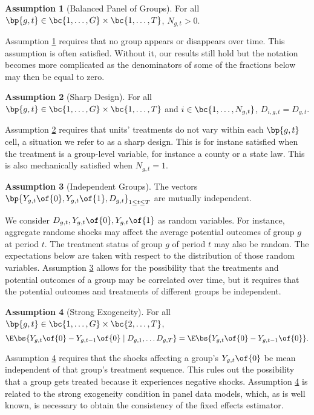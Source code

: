 \documentclass[12pt]{article}
\theoremstyle{definition}
\newtheorem{assumption}{Assumption}
\begin{document}
\begin{assumption}[Balanced Panel of Groups] \label{BPG}
    For all $\bp{g, t} \in \bc{1, \ldots, G} \times \bc{1, \ldots, T}$, $N_{g,t} > 0$.
\end{assumption}

Assumption \ref{BPG} requires that no group appears or disappears over time. This assumption is often satisfied. Without it, our results still hold but the notation becomes more complicated as the denominators of some of the fractions below may then be equal to zero. 

\begin{assumption}[Sharp Design] \label{SD}
    For all $\bp{g, t} \in \bc{1, \ldots, G} \times \bc{1, \ldots, T}$ and $i \in \bc{1, \ldots, N_{g,t}}$, $D_{i,g,t} = D_{g,t}$.
\end{assumption}

Assumption \ref{SD} requires that units' treatments do not vary within each $\bp{g,t}$ cell, a situation we refer to as a sharp design. This is for instane satisfied when the treatment is a group-level variable, for instance a county or a state law. This is also mechanically satisfied when $N_{g,t} = 1$. 

\begin{assumption}[Independent Groups] \label{IG}
    The vectors $\bp{Y_{g,t}\of{0}, Y_{g,t}\of{1}, D_{g,t}}_{1 \leq t \leq T}$ are mutually independent.
\end{assumption}

We consider $D_{g,t}, Y_{g,t}\of{0}, Y_{g,t}\of{1}$ as random variables. For instance, aggregate randome shocks may affect the average potential outcomes of group $g$ at period $t$. The treatment status of group $g$ of period $t$ may also be random. The expectations below are taken with respect to the distribution of those random variables. Assumption \ref{IG} allows for the possibility that the treatments and potential outcomes of a group may be correlated over time, but it requires that the potential outcomes and treatments of different groups be independent. 

\begin{assumption}[Strong Exogeneity] \label{SE}
    For all $\bp{g, t} \in \bc{1, \ldots, G} \times \bc{2, \ldots, T}$, 
    $$
    \E\bs{Y_{g,t}\of{0} - Y_{g, t-1}\of{0} \mid D_{g,1}, \ldots D_{g, T}} = \E\bs{Y_{g,t}\of{0} - Y_{g, t-1}\of{0}}.
    $$
\end{assumption}

Assumption \ref{SE} requires that the shocks affecting a group's $Y_{g,t}\of{0}$ be mean independent of that group's treatment sequence. This rules out the possibility that a group gets treated because it experiences negative shocks. Assumption \ref{SE} is related to the strong exogeneity condition in panel data models, which, as is well known, is necessary to obtain the consistency of the fixed effects estimator. 
\end{document}
